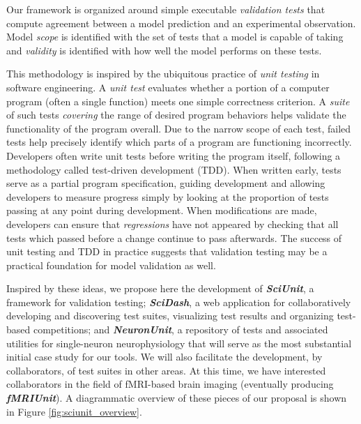 \documentclass[11pt,letterpaper]{article}
\begin{document}
Our framework is organized around simple executable \emph{validation tests} that compute agreement between a model prediction and an experimental observation. Model \textit{scope} is identified with the set of tests that a model is capable of taking and \textit{validity} is identified with how well the model performs on these tests.

This methodology is inspired by the ubiquitous practice of \emph{unit testing} in software engineering. A \emph{unit test} evaluates whether a portion of a computer program (often a single function) meets one simple correctness criterion. A \textit{suite} of such tests \emph{covering} the range of desired program behaviors helps validate the functionality of the program overall. Due to the narrow scope of each test, failed tests help precisely identify which parts of a program are functioning incorrectly. Developers often write unit tests before writing the program itself, following a methodology called test-driven development (TDD)\cite{beck2003}. When written early, tests serve as a partial program specification, guiding development and allowing developers to measure progress simply by looking at the proportion of tests passing at any point during development. When modifications are made, developers can ensure that \emph{regressions} have not appeared by checking that all tests which passed before a change continue to pass afterwards. The success of unit testing and TDD in practice suggests that validation testing may be a practical foundation for model validation as well.

Inspired by these ideas, we propose here the development of \textbf{\textit{SciUnit}}, a framework for validation testing; \textbf{\textit{SciDash}}, a web application for collaboratively developing and discovering test suites, visualizing test results and organizing test-based competitions; and \textbf{\textit{NeuronUnit}}, a repository of tests and associated utilities for single-neuron neurophysiology that will serve as the most substantial initial case study for our tools.  We will also facilitate the development, by collaborators, of test suites in other areas. At this time, we have interested collaborators in the field of fMRI-based brain imaging (eventually producing \textbf{\textit{fMRIUnit}}). A diagrammatic overview of these pieces of our proposal is shown in Figure \ref{fig:sciunit_overview}.
\end{document}
